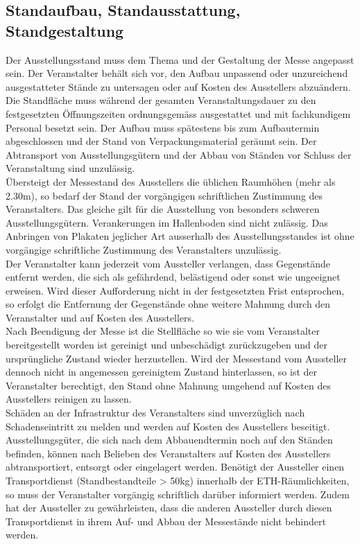 \documentclass[8pt,a4paper]{article}
\begin{document}
\begin{multicols}{2}
\section{Standaufbau, Standausstattung, Standgestaltung}
Der Ausstellungsstand muss dem Thema und der Gestaltung der Messe angepasst sein. Der Veranstalter behält sich vor, den Aufbau unpassend oder unzureichend ausgestatteter Stände zu untersagen oder auf Kosten des Ausstellers abzuändern. Die Standfläche muss während der gesamten Veranstaltungsdauer zu den festgesetzten Öffnungszeiten ordnungsgemäss ausgestattet und mit fachkundigem Personal besetzt sein. Der Aufbau muss spätestens bis zum Aufbautermin abgeschlossen und der Stand von Verpackungsmaterial geräumt sein. Der Abtransport von Ausstellungsgütern und der Abbau von Ständen vor Schluss der Veranstaltung sind unzulässig.\\
Übersteigt der Messestand des Ausstellers die üblichen Raumhöhen (mehr als 2.30m), so bedarf der Stand der vorgängigen schriftlichen Zustimmung des Veranstalters. Das gleiche gilt für die Ausstellung von besonders schweren Ausstellungsgütern. Verankerungen im Hallenboden sind nicht zulässig. Das Anbringen von Plakaten jeglicher Art ausserhalb des Ausstellungsstandes ist ohne vorgängige schriftliche Zustimmung des Veranstalters unzulässig. \\
Der Veranstalter kann jederzeit vom Aussteller verlangen, dass Gegenstände entfernt werden, die sich als gefährdend, belästigend oder sonst wie ungeeignet erweisen. Wird dieser Aufforderung nicht in der festgesetzten Frist entsprochen, so erfolgt die Entfernung der Gegenstände ohne weitere Mahnung durch den Veranstalter und auf Kosten des Ausstellers.\\
Nach Beendigung der Messe ist die Stellfläche so wie sie vom Veranstalter bereitgestellt worden ist gereinigt und unbeschädigt zurückzugeben und der ursprüngliche Zustand wieder herzustellen. Wird der Messestand vom Aussteller dennoch nicht in angemessen gereinigtem Zustand hinterlassen, so ist der Veranstalter berechtigt, den Stand ohne Mahnung umgehend auf Kosten des Ausstellers reinigen zu lassen.\\
Schäden an der Infrastruktur des Veranstalters sind unverzüglich nach Schadenseintritt zu melden und werden auf Kosten des Ausstellers beseitigt. Ausstellungsgüter, die sich nach dem Abbauendtermin noch auf den Ständen befinden, können nach Belieben des Veranstalters auf Kosten des Ausstellers abtransportiert, entsorgt oder eingelagert werden.
Benötigt der Aussteller einen Transportdienst (Standbestandteile > 50kg) innerhalb der ETH-Räumlichkeiten, so muss der Veranstalter vorgängig schriftlich darüber informiert werden. Zudem hat der Aussteller zu gewährleisten, dass die anderen Aussteller durch diesen Transportdienst in ihrem Auf- und Abbau der Messestände nicht behindert werden.


\end{multicols}
\end{document}
